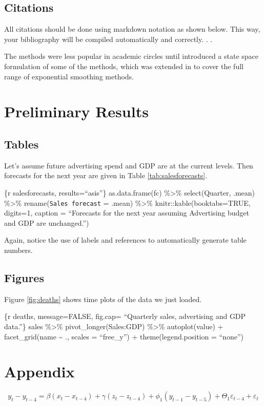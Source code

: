 \documentclass{monashthesis}
\begin{document}
\hypertarget{citations}{%
\section{Citations}\label{citations}}

All citations should be done using markdown notation as shown below. This way, your bibliography will be compiled automatically and correctly. \autocite{FZMP23,BG69}.
\autocite[see][]{FZMP23}.

The methods were less popular in academic circles until \textcite{FZMP23} introduced a state space formulation of some of the methods, which was extended in \textcite{HKSG02} to cover the full range of exponential smoothing methods.

\hypertarget{preliminary-results}{%
\chapter{Preliminary Results}\label{preliminary-results}}

\hypertarget{tables}{%
\section{Tables}\label{tables}}

Let's assume future advertising spend and GDP are at the current levels. Then forecasts for the next year are given in Table \ref{tab:salesforecasts}.

\{r salesforecasts, results=``asis''\}
as.data.frame(fc) \%\textgreater\%
select(Quarter, .mean) \%\textgreater\%
rename(\texttt{Sales\ forecast} = .mean) \%\textgreater\%
knitr::kable(booktabs=TRUE, digits=1,
caption = ``Forecasts for the next year assuming Advertising budget and GDP are unchanged.'')

Again, notice the use of labels and references to automatically generate table numbers.

\hypertarget{figures}{%
\section{Figures}\label{figures}}

Figure \ref{fig:deaths} shows time plots of the data we just loaded.

\{r deaths, message=FALSE, fig.cap= ``Quarterly sales, advertising and GDP data.''\}
sales \%\textgreater\%
pivot\_longer(Sales:GDP) \%\textgreater\%
autoplot(value) +
facet\_grid(name \textasciitilde{} ., scales = ``free\_y'') +
theme(legend.position = ``none'')

\appendix

\hypertarget{appendix}{%
\chapter{Appendix}\label{appendix}}

\begin{equation}
  y_t - y_{t-4} = \beta (x_t-x_{t-4}) + \gamma (z_t-z_{t-4}) + \phi_1 (y_{t-1} - y_{t-5}) + \Theta_1 \varepsilon_{t-4} + \varepsilon_t
\end{equation}

\printbibliography[title={Reference}]
\end{document}
